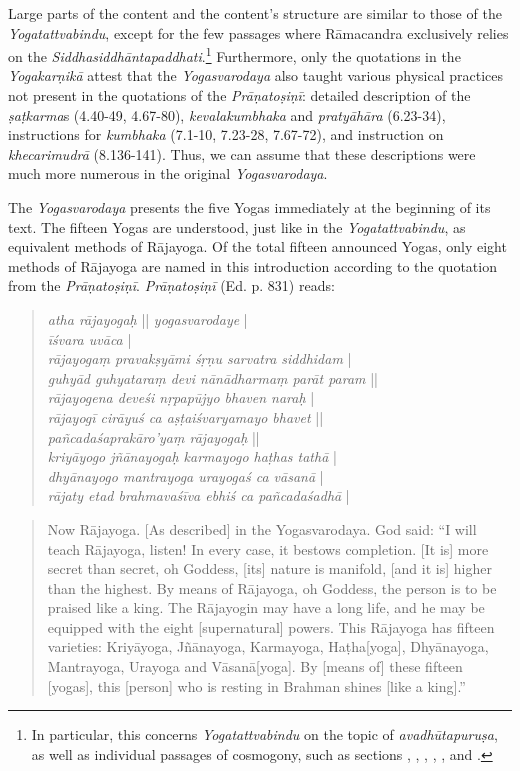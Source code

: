 Large parts of the content and the content's structure are similar to those of the \emph{Yogatattvabindu}, except for the few passages where Rāmacandra exclusively relies on the \emph{Siddhasiddhāntapaddhati}.\footnote{In particular, this concerns \textit{Yogatattvabindu}  on the topic of \textit{avadhūtapuruṣa}, as well as individual passages of cosmogony, such as sections , , , , , and .} Furthermore, only the quotations in the \emph{Yogakarṇikā} attest that the \emph{Yogasvarodaya} also taught various physical practices not present in the quotations of the \emph{Prāṇatoṣiṇī}: detailed description of the \textit{ṣaṭkarma}s (4.40-49, 4.67-80), \textit{kevalakumbhaka} and \textit{pratyāhāra} (6.23-34), instructions for \textit{kumbhaka} (7.1-10, 7.23-28, 7.67-72), and instruction on \textit{khecarimudrā} (8.136-141). Thus, we can assume that these descriptions were much more numerous in the original \emph{Yogasvarodaya}.

The \emph{Yogasvarodaya} presents the five Yogas immediately at the beginning of its text. The fifteen Yogas are understood, just like in the \emph{Yogatattvabindu}, as equivalent methods of Rājayoga. Of the total fifteen announced Yogas, only eight methods of Rājayoga are named in this introduction according to the quotation from the \emph{Prāṇatoṣiṇī}. \emph{Prāṇatoṣiṇī} (Ed. p. 831) reads:

\begin{quote}
  \textit{atha rājayogaḥ} || \textit{yogasvarodaye} | \\
  \textit{īśvara uvāca} |\\
  \textit{rājayogaṃ pravakṣyāmi śṛṇu sarvatra siddhidam} | \\
  \textit{guhyād guhyataraṃ devi nānādharmaṃ parāt param} || \\
  \textit{rājayogena deveśi nṛpapūjyo bhaven naraḥ} |\\
  \textit{rājayogī cirāyuś ca aṣṭaiśvaryamayo bhavet} || \\
  \textit{pañcadaśaprakāro'yaṃ rājayogaḥ} ||\\
  \textit{kriyāyogo jñānayogaḥ karmayogo haṭhas tathā} |\\
  \textit{dhyānayogo mantrayoga urayogaś ca vāsanā} |\\
  \textit{rājaty etad brahmavaśīva ebhiś ca pañcadaśadhā} |
\end{quote}
\begin{quote}
Now Rājayoga. [As described] in the Yogasvarodaya. 
God said: ``I will teach Rājayoga, listen! In every case, it bestows completion. 
[It is] more secret than secret, oh Goddess, [its] nature is manifold, [and it is] higher than the highest. 
By means of Rājayoga, oh Goddess, the person is to be praised like a king.
The Rājayogin may have a long life, and he may be equipped with the eight [supernatural] powers.
This Rājayoga has fifteen varieties:
Kriyāyoga, Jñānayoga, Karmayoga, Haṭha[yoga], 
Dhyānayoga, Mantrayoga, Urayoga and Vāsanā[yoga]. 
By [means of] these fifteen [yogas], this [person] who is resting in Brahman shines [like a king].''
\end{quote}

